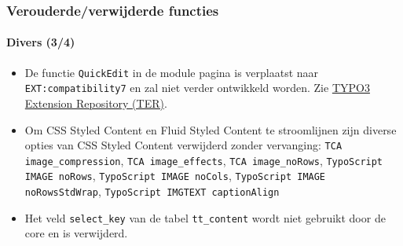 \begin{frame}[fragile]
	\frametitle{Verouderde/verwijderde functies}
	\framesubtitle{Divers (3/4)}

	\begin{itemize}
		\item De functie \texttt{QuickEdit} in de module pagina is verplaatst naar
			\texttt{EXT:compatibility7} en zal niet verder ontwikkeld worden.\newline
			Zie \href{https://typo3.org/extensions/repository}{TYPO3 Extension Repository (TER)}.

		\item Om CSS Styled Content en Fluid Styled Content te stroomlijnen zijn diverse opties
		 	van CSS Styled Content verwijderd zonder vervanging:
			\texttt{TCA image\_compression}, \texttt{TCA image\_effects}, \texttt{TCA image\_noRows},
			\texttt{TypoScript IMAGE noRows}, \texttt{TypoScript IMAGE noCols},
			\texttt{TypoScript IMAGE noRowsStdWrap}, \texttt{TypoScript IMGTEXT captionAlign}

		\item Het veld \texttt{select\_key} van de tabel \texttt{tt\_content} wordt niet gebruikt
			door de core en is verwijderd.

	\end{itemize}

\end{frame}


